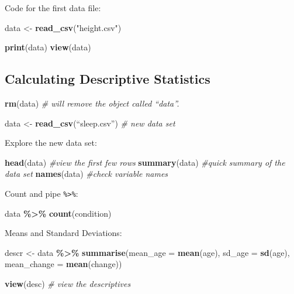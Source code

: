 \documentclass[
]{book}
\newenvironment{Shaded}{\begin{snugshade}}{\end{snugshade}}
\newcommand{\AttributeTok}[1]{\textcolor[rgb]{0.13,0.29,0.53}{#1}}
\newcommand{\CommentTok}[1]{\textcolor[rgb]{0.56,0.35,0.01}{\textit{#1}}}
\newcommand{\FunctionTok}[1]{\textcolor[rgb]{0.13,0.29,0.53}{\textbf{#1}}}
\newcommand{\NormalTok}[1]{#1}
\newcommand{\OtherTok}[1]{\textcolor[rgb]{0.56,0.35,0.01}{#1}}
\newcommand{\SpecialCharTok}[1]{\textcolor[rgb]{0.81,0.36,0.00}{\textbf{#1}}}
\newcommand{\StringTok}[1]{\textcolor[rgb]{0.31,0.60,0.02}{#1}}
\begin{document}
Code for the first data file:

\begin{Shaded}
\begin{Highlighting}[]
\NormalTok{data }\OtherTok{\textless{}{-}} \FunctionTok{read\_csv}\NormalTok{(}\StringTok{"height.csv"}\NormalTok{)}

\FunctionTok{print}\NormalTok{(data)}
\FunctionTok{view}\NormalTok{(data)}
\end{Highlighting}
\end{Shaded}

\subsection{Calculating Descriptive Statistics}\label{calculating-descriptive-statistics}

\begin{Shaded}
\begin{Highlighting}[]
\FunctionTok{rm}\NormalTok{(data) }\CommentTok{\# will remove the object called “data”.}

\NormalTok{data }\OtherTok{\textless{}{-}} \FunctionTok{read\_csv}\NormalTok{(“sleep.csv”) }\CommentTok{\# new data set}
\end{Highlighting}
\end{Shaded}

Explore the new data set:

\begin{Shaded}
\begin{Highlighting}[]
\FunctionTok{head}\NormalTok{(data) }\CommentTok{\#view the first few rows}
\FunctionTok{summary}\NormalTok{(data) }\CommentTok{\#quick summary of the data set}
\FunctionTok{names}\NormalTok{(data) }\CommentTok{\#check variable names}
\end{Highlighting}
\end{Shaded}

Count and pipe \texttt{\%\textgreater{}\%}:

\begin{Shaded}
\begin{Highlighting}[]
\NormalTok{data }\SpecialCharTok{\%\textgreater{}\%}
    \FunctionTok{count}\NormalTok{(condition) }
\end{Highlighting}
\end{Shaded}

Means and Standard Deviations:

\begin{Shaded}
\begin{Highlighting}[]
\NormalTok{descr }\OtherTok{\textless{}{-}}\NormalTok{ data }\SpecialCharTok{\%\textgreater{}\%}  
    \FunctionTok{summarise}\NormalTok{(}\AttributeTok{mean\_age =} \FunctionTok{mean}\NormalTok{(age),}
              \AttributeTok{sd\_age =} \FunctionTok{sd}\NormalTok{(age),}
              \AttributeTok{mean\_change =} \FunctionTok{mean}\NormalTok{(change))}

\FunctionTok{view}\NormalTok{(desc) }\CommentTok{\# view the descriptives}
\end{Highlighting}
\end{Shaded}
\end{document}
